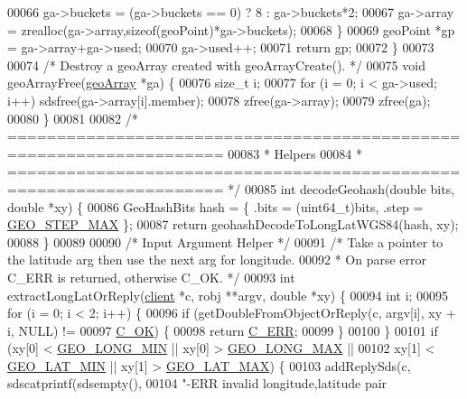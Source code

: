 \begin{DoxyCode}
00066         ga->buckets = (ga->buckets == 0) ? 8 : ga->buckets*2;
00067         ga->array = zrealloc(ga->array,\textcolor{keyword}{sizeof}(geoPoint)*ga->buckets);
00068     \}
00069     geoPoint *gp = ga->array+ga->used;
00070     ga->used++;
00071     \textcolor{keywordflow}{return} gp;
00072 \}
00073 
00074 \textcolor{comment}{/* Destroy a geoArray created with geoArrayCreate(). */}
00075 \textcolor{keywordtype}{void} geoArrayFree(\hyperlink{structgeoArray}{geoArray} *ga) \{
00076     size\_t i;
00077     \textcolor{keywordflow}{for} (i = 0; i < ga->used; i++) sdsfree(ga->array[i].member);
00078     zfree(ga->array);
00079     zfree(ga);
00080 \}
00081 
00082 \textcolor{comment}{/* ====================================================================}
00083 \textcolor{comment}{ * Helpers}
00084 \textcolor{comment}{ * ==================================================================== */}
00085 \textcolor{keywordtype}{int} decodeGeohash(\textcolor{keywordtype}{double} bits, \textcolor{keywordtype}{double} *xy) \{
00086     GeoHashBits hash = \{ .bits = (uint64\_t)bits, .step = \hyperlink{geohash_8h_a4c2e31e393c541a34939f7b4ae1d23d3}{GEO\_STEP\_MAX} \};
00087     \textcolor{keywordflow}{return} geohashDecodeToLongLatWGS84(hash, xy);
00088 \}
00089 
00090 \textcolor{comment}{/* Input Argument Helper */}
00091 \textcolor{comment}{/* Take a pointer to the latitude arg then use the next arg for longitude.}
00092 \textcolor{comment}{ * On parse error C\_ERR is returned, otherwise C\_OK. */}
00093 \textcolor{keywordtype}{int} extractLongLatOrReply(\hyperlink{structclient}{client} *c, robj **argv, \textcolor{keywordtype}{double} *xy) \{
00094     \textcolor{keywordtype}{int} i;
00095     \textcolor{keywordflow}{for} (i = 0; i < 2; i++) \{
00096         \textcolor{keywordflow}{if} (getDoubleFromObjectOrReply(c, argv[i], xy + i, NULL) !=
00097             \hyperlink{server_8h_a303769ef1065076e68731584e758d3e1}{C\_OK}) \{
00098             \textcolor{keywordflow}{return} \hyperlink{server_8h_af98ac28d5f4d23d7ed5985188e6fb7d1}{C\_ERR};
00099         \}
00100     \}
00101     \textcolor{keywordflow}{if} (xy[0] < \hyperlink{geohash_8h_abf32454c8db6da7cf595d5ac092bb313}{GEO\_LONG\_MIN} || xy[0] > \hyperlink{geohash_8h_a86a07918583c89467cf3e459adf513f5}{GEO\_LONG\_MAX} ||
00102         xy[1] < \hyperlink{geohash_8h_a7da01a8f44929d11f00b2966c834a9b9}{GEO\_LAT\_MIN}  || xy[1] > \hyperlink{geohash_8h_a831d966c99458d47620ea66a4c6768ab}{GEO\_LAT\_MAX}) \{
00103         addReplySds(c, sdscatprintf(sdsempty(),
00104             \textcolor{stringliteral}{"-ERR invalid longitude,latitude pair %
}
\end{DoxyCode}
